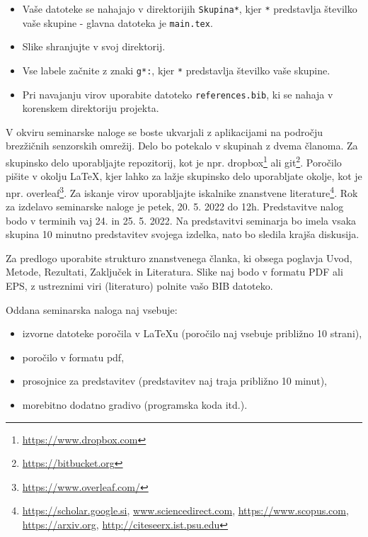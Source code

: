 \begin{itemize}
\item Vaše datoteke se nahajajo v direktorijih \texttt{Skupina*}, kjer \texttt{*} predstavlja številko vaše skupine - glavna datoteka je \texttt{main.tex}.
\item Slike shranjujte v svoj direktorij.
\item Vse labele začnite z znaki \texttt{g*:}, kjer \texttt{*} predstavlja številko vaše skupine.
\item Pri navajanju virov uporabite datoteko \texttt{references.bib}, ki se nahaja v korenskem direktoriju projekta.
\end{itemize}

V okviru seminarske naloge se boste ukvarjali z aplikacijami na področju brezžičnih senzorskih omrežij. Delo bo potekalo v skupinah z dvema članoma. Za skupinsko delo uporabljajte repozitorij, kot je npr. dropbox\footnote{\url{https://www.dropbox.com}} ali git\footnote{\url{https://bitbucket.org}}. Poročilo pišite v okolju LaTeX, kjer lahko za lažje skupinsko delo uporabljate okolje, kot je npr. overleaf\footnote{\url{https://www.overleaf.com/}}. Za iskanje virov uporabljajte iskalnike znanstvene literature\footnote{\url{https://scholar.google.si}, \url{www.sciencedirect.com}, \url{https://www.scopus.com}, \url{https://arxiv.org}, \url{http://citeseerx.ist.psu.edu}}. Rok za izdelavo seminarske naloge je petek, 20. 5. 2022 do 12h. Predstavitve nalog bodo v terminih vaj 24. in 25. 5. 2022. Na predstavitvi seminarja bo imela vsaka skupina 10 minutno predstavitev svojega izdelka, nato bo sledila krajša diskusija.

Za predlogo uporabite strukturo znanstvenega članka, ki obsega poglavja Uvod, Metode, Rezultati, Zaključek in Literatura. Slike naj bodo v formatu PDF ali EPS, z ustreznimi viri (literaturo) polnite vašo BIB datoteko.

Oddana seminarska naloga naj vsebuje:

\begin{itemize}
	\item izvorne datoteke poročila v LaTeXu (poročilo naj vsebuje približno 10 strani),
	\item poročilo v formatu pdf,
	\item prosojnice za predstavitev (predstavitev naj traja približno 10 minut),
	\item morebitno dodatno gradivo (programska koda itd.).
\end{itemize}

